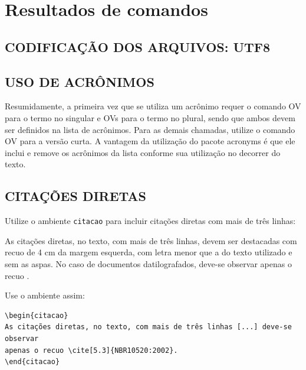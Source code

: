 \chapter{Resultados de comandos}\label{cap_exemplos}


\section{\uppercase{Codificação dos arquivos: UTF8}}


\section{\uppercase{Uso de Acrônimos}}
\label{sec-acronimos}

Resumidamente, a primeira vez que se utiliza um acrônimo requer o comando \acf{OV} para o termo no singular e \acfp{OV} para o termo no plural, sendo que ambos devem ser definidos na lista de acrônimos. Para as demais chamadas, utilize o comando \acs{OV} para a versão curta. A vantagem da utilização do pacote acronyms é que ele inclui e remove os acrônimos da lista conforme sua utilização no decorrer do texto. 

\section{\uppercase{Citações diretas}}
\label{sec-citacao}

Utilize o ambiente \texttt{citacao} para incluir
citações diretas com mais de três linhas:

\begin{citacao}
As citações diretas, no texto, com mais de três linhas, devem ser
destacadas com recuo de 4 cm da margem esquerda, com letra menor que a do texto
utilizado e sem as aspas. No caso de documentos datilografados, deve-se
observar apenas o recuo \cite[5.3]{NBR10520:2002}.
\end{citacao}

Use o ambiente assim:

\begin{verbatim}
\begin{citacao}
As citações diretas, no texto, com mais de três linhas [...] deve-se observar
apenas o recuo \cite[5.3]{NBR10520:2002}.
\end{citacao}
\end{verbatim}

